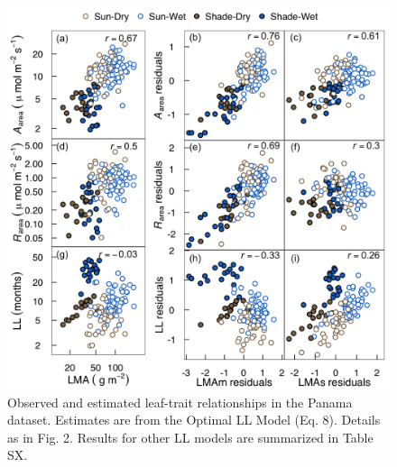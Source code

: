 \documentclass[
  12pt,
]{article}
\begin{document}
\begin{figure}
\hypertarget{fig:PAplt}{%
\centering
\includegraphics{../figs/PA_3.png}
\caption{Observed and estimated leaf-trait relationships in the Panama dataset. Estimates are from the Optimal LL Model (Eq. 8). Details as in Fig. 2. Results for other LL models are summarized in Table SX.}\label{fig:PAplt}
}
\end{figure}

\newpage
\end{document}
